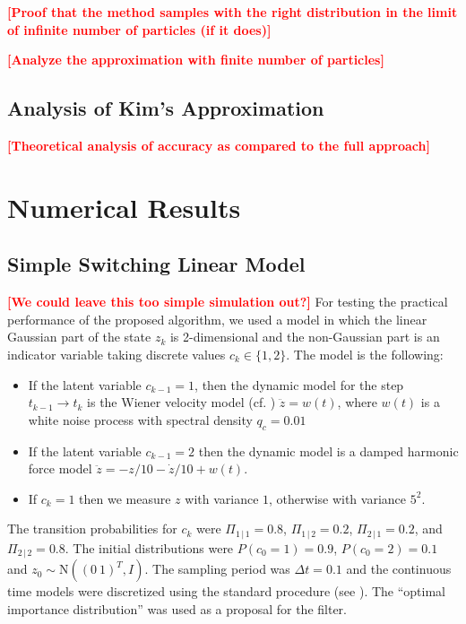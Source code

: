 \documentclass[twocolumn]{autart}    %
\newcommand{\comment}[1]{\textcolor{red}{\textbf{[#1]}}}
\begin{document}
\comment{Proof that the method samples with the right distribution
in the limit of infinite number of particles (if it does)}

\comment{Analyze the approximation with finite number of particles}

\subsection{Analysis of Kim's Approximation}

\comment{Theoretical analysis of accuracy as compared to the full
  approach}


\section{Numerical Results}

\subsection{Simple Switching Linear Model}
%
\comment{We could leave this too simple simulation out?}
For testing the practical performance of the proposed algorithm, we
used a model in which the linear Gaussian part of the state $z_k$ is
2-dimensional and the non-Gaussian part is an indicator variable taking
discrete values $c_k \in\{1,2\}$. The model is the following:
%
\begin{itemize}
\item If the latent variable $c_{k-1} = 1$, then the dynamic model for
  the step $t_{k-1} \rightarrow t_k$ is the Wiener velocity model
  (cf. \cite{Bar-Shalom+Li+Kirubarajan:2001}) $\ddot{z} = w(t)$,
  where $w(t)$ is a white noise process with spectral density $q_c =
  0.01$
\item If the latent variable $c_{k-1} = 2$ then the dynamic model
  is a damped harmonic force model $\ddot{z} = -z/10 - \dot{z}/10 + w(t)$.
\item If $c_k = 1$ then we measure $z$ with variance $1$, otherwise
  with variance $5^2$.
\end{itemize}
%
The transition probabilities for $c_k$ were $\Pi_{1\,|\,1} = 0.8$,
$\Pi_{1\,|\,2} = 0.2$, $\Pi_{2\,|\,1} = 0.2$, and $\Pi_{2\,|\,2} =
0.8$. The initial distributions were $P(c_0=1) = 0.9$, $P(c_0=2) =
0.1$ and $z_0 \sim \mathrm{N}((0~1)^T,I)$. The sampling period was
$\Delta t = 0.1$ and the continuous time models were discretized using
the standard procedure (see \cite{Bar-Shalom+Li+Kirubarajan:2001}).
The ``optimal importance distribution''
\cite{Doucet+Godsill+Andrieu:2000} was used as a proposal for the
filter.
\end{document}

